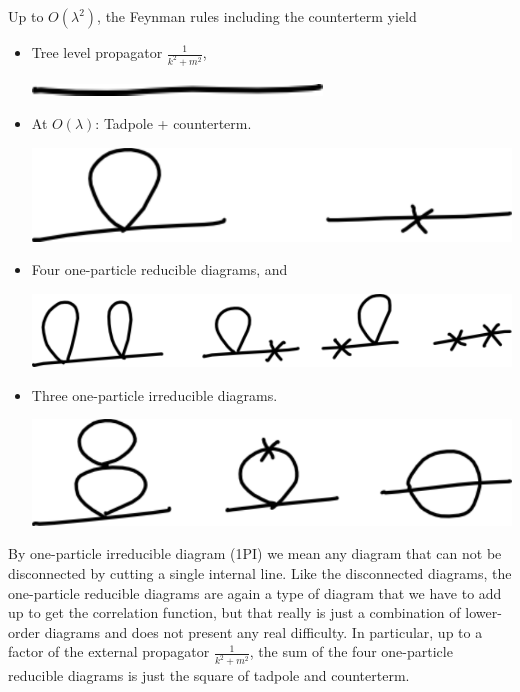 \documentclass[12pt]{article}
\begin{document}
Up to $O(\lambda^2)$, the Feynman rules including the counterterm
yield
\begin{itemize}
\item Tree level propagator $\frac{1}{k^2+m^2}$,
  \begin{center}
    \includegraphics[scale=0.7]{figures/draw-propagator-tree.pdf}
  \end{center}
\item At $O(\lambda)$: Tadpole + counterterm.
  \begin{center}
    \includegraphics[scale=0.7]{figures/draw-propagator-tadpole_and_counterterm.pdf}
  \end{center}
\item Four one-particle reducible diagrams, and
  \begin{center}
    \includegraphics[scale=0.7]{figures/draw-propagator-twoloop_reducible.pdf}
  \end{center}
\item Three one-particle irreducible diagrams.
  \begin{center}
    \includegraphics[scale=0.7]{figures/draw-propagator-twoloop_1PI.pdf}
  \end{center}
\end{itemize}
By one-particle irreducible diagram (1PI) we mean any diagram that can
not be disconnected by cutting a single internal line. Like the
disconnected diagrams, the one-particle reducible diagrams are again a
type of diagram that we have to add up to get the correlation
function, but that really is just a combination of lower-order
diagrams and does not present any real difficulty. In particular, up
to a factor of the external propagator $\frac{1}{k^2+m^2}$, the sum of
the four one-particle reducible diagrams is just the square of tadpole
and counterterm.
\end{document}
